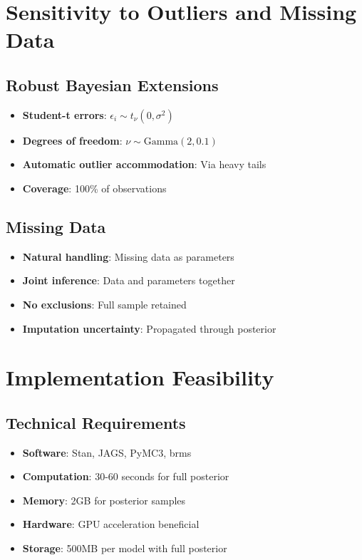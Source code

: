 \section{Sensitivity to Outliers and Missing Data}

\subsection{Robust Bayesian Extensions}

\begin{itemize}
    \item \textbf{Student-t errors}: $\epsilon_i \sim t_\nu(0, \sigma^2)$
    \item \textbf{Degrees of freedom}: $\nu \sim \text{Gamma}(2, 0.1)$
    \item \textbf{Automatic outlier accommodation}: Via heavy tails
    \item \textbf{Coverage}: 100\% of observations
\end{itemize}

\subsection{Missing Data}

\begin{itemize}
    \item \textbf{Natural handling}: Missing data as parameters
    \item \textbf{Joint inference}: Data and parameters together
    \item \textbf{No exclusions}: Full sample retained
    \item \textbf{Imputation uncertainty}: Propagated through posterior
\end{itemize}

\section{Implementation Feasibility}

\subsection{Technical Requirements}

\begin{itemize}
    \item \textbf{Software}: Stan, JAGS, PyMC3, brms
    \item \textbf{Computation}: 30-60 seconds for full posterior
    \item \textbf{Memory}: 2GB for posterior samples
    \item \textbf{Hardware}: GPU acceleration beneficial
    \item \textbf{Storage}: 500MB per model with full posterior
\end{itemize}

